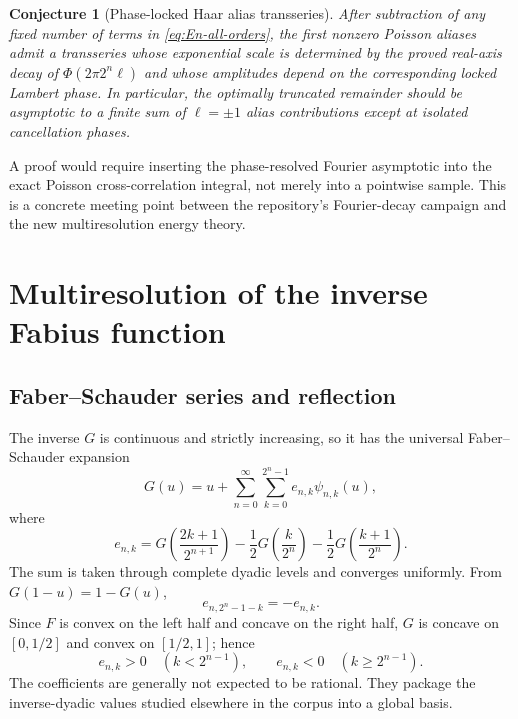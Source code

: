 \documentclass[11pt,oneside]{article}
\newtheorem{conjecture}[theorem]{Conjecture}
\theoremstyle{definition}
\theoremstyle{remark}
\begin{document}
\begin{conjecture}[Phase-locked Haar alias transseries]
\label{conj:Haar-alias}
After subtraction of any fixed number of terms in
\eqref{eq:En-all-orders}, the first nonzero Poisson aliases admit a transseries
whose exponential scale is determined by the proved real-axis decay of
$\Phi(2\pi2^n\ell)$ and whose amplitudes depend on the corresponding locked
Lambert phase.  In particular, the optimally truncated remainder should be
asymptotic to a finite sum of $\ell=\pm1$ alias contributions except at isolated
cancellation phases.
\end{conjecture}

A proof would require inserting the phase-resolved Fourier asymptotic into the
exact Poisson cross-correlation integral, not merely into a pointwise sample.
This is a concrete meeting point between the repository's Fourier-decay campaign
and the new multiresolution energy theory.

\section{Multiresolution of the inverse Fabius function}
\label{sec:inverse-multiresolution}

\subsection{Faber--Schauder series and reflection}

The inverse $G$ is continuous and strictly increasing, so it has the universal
Faber--Schauder expansion
\begin{equation}\label{eq:G-Schauder}
 G(u)=u+\sum_{n=0}^\infty\sum_{k=0}^{2^n-1}
 e_{n,k}\psi_{n,k}(u),
\end{equation}
where
\begin{equation}\label{eq:e-inverse-Schauder}
 e_{n,k}=G\!\left(\frac{2k+1}{2^{n+1}}\right)
 -\frac12G\!\left(\frac{k}{2^n}\right)
 -\frac12G\!\left(\frac{k+1}{2^n}\right).
\end{equation}
The sum is taken through complete dyadic levels and converges uniformly.  From
$G(1-u)=1-G(u)$,
\begin{equation}\label{eq:e-inverse-antisymmetry}
 e_{n,2^n-1-k}=-e_{n,k}.
\end{equation}
Since $F$ is convex on the left half and concave on the right half, $G$ is
concave on $[0,1/2]$ and convex on $[1/2,1]$; hence
\begin{equation}\label{eq:e-inverse-sign}
 e_{n,k}>0\quad(k<2^{n-1}),
 \qquad
 e_{n,k}<0\quad(k\ge2^{n-1}).
\end{equation}
The coefficients are generally not expected to be rational.  They package the
inverse-dyadic values studied elsewhere in the corpus into a global basis.
\end{document}
